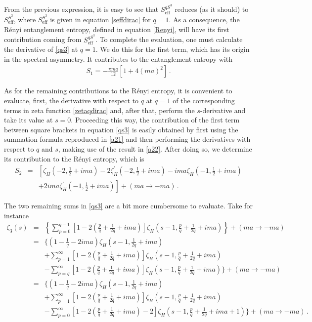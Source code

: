 \documentclass[12pt,a4paper]{article}
\newcommand{\beq}{\begin{eqnarray}}
\newcommand{\eeq}{\end{eqnarray}}
\newcommand{\nn}{\nonumber}
\numberwithin{equation}{section}
\begin{document}
From the previous expression, it is easy to see that $S_{\mathrm{eff}}^{qS^3}$ reduces (as it should) to $S_{\mathrm{eff}}^{S^3}$, where $S_{\mathrm{eff}}^{S^3}$ is given in equation \eqref{seffdirac} for $q=1$. As a consequence, the R\'enyi entanglement entropy, defined in equation \eqref{Renyi}, will have its first contribution coming from $S_{\mathrm{eff}}^{qS^3}$. To complete the evaluation, one must calculate the derivative of \eqref{qs3} at $q=1$. We do this for the first term, which has its origin in the spectral asymmetry. It contributes to the entanglement entropy with
\beq
S_1=-\frac{\pi ma}{12}\left[1+4(ma)^2\right]\,. \label{1}\eeq

As for the remaining contributions to the R\'enyi entropy, it is convenient to evaluate, first, the derivative with respect to $q$ at $q=1$ of the corresponding terms in zeta function \eqref{zetaqdirac} and, after that, perform the $s$-derivative and take its value at $s=0$. Proceeding this way, the contribution of the first term between square brackets in equation \eqref{qs3} is easily obtained by first using the  summation formula reproduced in \eqref{a21} and then performing the derivatives with respect to $q$ and $s$, making use of the result in \eqref{a22}. After doing so, we determine its contribution to the R\'enyi entropy, which is
\beq
S_2&=&\left[{\zeta}_H \left(-2,\frac{1}{2}+ima\right)-2{\zeta}^{\prime}_H \left(-2,\frac{1}{2}+ima\right)-i ma {\zeta}_H \left(-1,\frac{1}{2}+ima\right)\right.\nn \\&& +\left. 2i ma {\zeta}^{\prime}_H \left(-1,\frac{1}{2}+ima\right)\right]+(ma\rightarrow -ma)\,.\label{2}\eeq

The two remaining sums in \eqref{qs3} are a bit more cumbersome to evaluate. Take for instance
\beq
{\zeta_3}(s)&=&\left\{\sum_{p=0}^{q-1}\left[1-2\left(\frac{p}{q}+\frac{1}{2q}+ i ma\right)\right]{\zeta}_H \left(s-1,\frac{p}{q}+\frac{1}{2q}+ima\right)\right\}+(ma\rightarrow -ma)\nn \\&=&
\Bigg\{\left(1-\frac{1}{q}-2 i ma\right){\zeta}_H \left(s-1,\frac{1}{2q}+ima\right)\nn\\
&&+\sum_{p=1}^{\infty}\left[1-2\left(\frac{p}{q}+\frac{1}{2q}+ i ma\right)\right]{\zeta}_H \left(s-1,\frac{p}{q}+\frac{1}{2q}+ima\right)\nn \\
&& -\sum_{p=q}^{\infty}\left[1-2\left(\frac{p}{q}+\frac{1}{2q}+ i ma\right)\right]{\zeta}_H \left(s-1,\frac{p}{q}+\frac{1}{2q}+ima\right)\Bigg\}+(ma\rightarrow -ma)\nn\\
&=&\Bigg\{\left(1-\frac{1}{q}-2 i ma\right){\zeta}_H \left(s-1,\frac{1}{2q}+ima\right)\nn\\
&&+\sum_{p=1}^{\infty}\left[1-2\left(\frac{p}{q}+\frac{1}{2q}+ i ma\right)\right]{\zeta}_H \left(s-1,\frac{p}{q}+\frac{1}{2q}+ima\right)\nn \\
&& -\sum_{p=0}^{\infty}\left[1-2\left(\frac{p}{q}+\frac{1}{2q}+ i ma\right)-2\right]{\zeta}_H \left(s-1,\frac{p}{q}+\frac{1}{2q}+i ma+1\right)\Bigg\}+(ma\rightarrow -ma)\nn\,.\eeq
\end{document}
